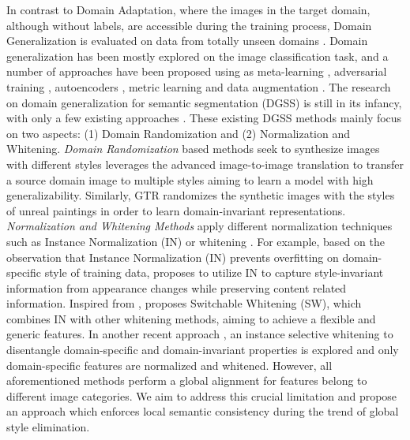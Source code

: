 \documentclass[10pt,twocolumn,letterpaper]{article}
\begin{document}
In contrast to Domain Adaptation, where the images in the target domain, although without labels, are accessible during the training process, Domain Generalization is evaluated on data from totally unseen domains \cite{muandet2013domain,gan2016learning}. Domain generalization has been mostly explored on the image classification task, and a number of approaches have been proposed using as meta-learning \cite{li2018learning,balaji2018metareg,li2019episodic,li2019feature}, adversarial training \cite{li2018domain,li2018deep,rahman2020correlation}, autoencoders \cite{ghifary2015domain,li2018deep}, metric learning \cite{dou2019domain,motiian2017unified} and data augmentation \cite{gong2019dlow,zhou2020learning}. 
The research on domain generalization for semantic segmentation (DGSS) is still in its infancy, with only a few existing approaches \cite{yue2019domain,peng2021global,pan2018two,pan2019switchable,choi2021robustnet}. These existing DGSS methods mainly focus on two aspects: (1) Domain Randomization and (2) Normalization and Whitening. \textit{Domain Randomization} based methods seek to synthesize images with different styles \eg \cite{yue2019domain} leverages the advanced image-to-image translation to transfer a source domain image to multiple
styles aiming to learn a model with high generalizability. Similarly, GTR \cite{peng2021global} randomizes the synthetic images with the styles of unreal paintings in order to learn domain-invariant representations.
\textit{Normalization and Whitening Methods} apply different normalization techniques such as Instance Normalization (IN) \cite{ulyanov2017improved} or whitening \cite{pan2019switchable}. For example, based on the observation that Instance Normalization (IN) \cite{ulyanov2017improved} prevents overfitting on domain-specific style of training data, \cite{pan2018two} proposes to utilize IN to capture style-invariant information from appearance changes while preserving content related information. Inspired from \cite{pan2018two}, \cite{pan2018two} proposes Switchable Whitening (SW), which combines IN with other whitening methods, aiming to achieve a flexible and generic features. In another recent approach \cite{choi2021robustnet}, an instance selective whitening to disentangle domain-specific and domain-invariant properties is explored and only domain-specific features are normalized and whitened. However, all aforementioned methods perform a global alignment for features belong to different image categories. We aim to address this crucial limitation and propose an approach which enforces local semantic consistency during the trend of global style elimination.
\end{document}
